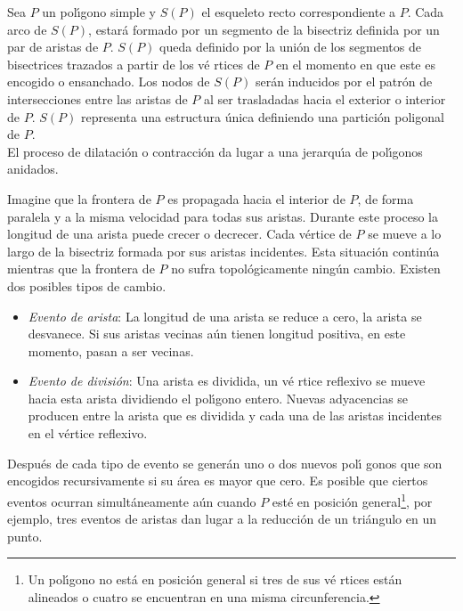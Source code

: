 \documentclass[12pt,english]{report}
\begin{document}
Sea $P$ un pol\'{\i}gono simple y $S(P)$ el esqueleto recto correspondiente
a $P$. Cada arco de $S(P)$, estar\'{a} formado por un segmento de la
bisectriz definida por un par de aristas de $P$. $S(P)$ queda definido por la
uni\'{o}n de los segmentos de bisectrices trazados a partir de los v\'{e}%
rtices de $P$ en el momento en que este es encogido o ensanchado. Los nodos
de $S(P)$ ser\'{a}n inducidos por el patr\'{o}n de intersecciones entre las
aristas de $P$ al ser trasladadas hacia el exterior o interior de $P$. $%
S(P)$ representa una estructura \'{u}nica definiendo una partici\'{o}n
poligonal de $P$.\\ El proceso de dilataci\'{o}n o contracci\'{o}n da lugar a
una jerarqu\'{\i}a de pol\'{\i}gonos anidados. %

Imagine que la frontera de $P$ es propagada hacia el interior de $P$, de
forma paralela y a la misma velocidad para todas sus aristas. Durante este
proceso la longitud de una arista puede crecer o decrecer. Cada v\'{e}rtice
de $P$ se mueve a lo largo de la bisectriz formada por sus aristas
incidentes. Esta situaci\'{o}n contin\'{u}a mientras que la frontera de $P$
no sufra topol\'{o}gicamente ning\'{u}n cambio. Existen dos posibles tipos
de cambio.

\begin{itemize}
\item[(1)] \emph{Evento de arista}: La longitud de una arista se reduce a
cero, la arista se desvanece. Si sus aristas vecinas a\'{u}n tienen longitud
positiva, en este momento, pasan a ser vecinas.

\item[(2)] \emph{Evento de divisi\'{o}n}: Una arista es dividida, un v\'{e}%
rtice reflexivo se mueve hacia esta arista dividiendo el pol\'{\i}gono entero. Nuevas adyacencias se
producen entre la arista que es dividida y cada una de las aristas
incidentes en el v\'{e}rtice reflexivo.
\end{itemize}

Despu\'{e}s de cada tipo de evento se gener\'{a}n uno o dos nuevos pol\'{\i}%
gonos que son encogidos recursivamente si su \'{a}rea es mayor que cero. Es
posible que ciertos eventos ocurran simult\'{a}neamente a\'{u}n cuando $P$
est\'{e} en posici\'{o}n general\footnote[1]{%
Un pol\'{\i}gono no est\'{a} en posici\'{o}n general si tres de sus v\'{e}%
rtices est\'{a}n alineados o cuatro se encuentran en una misma circunferencia.}, por ejemplo, tres eventos de aristas dan lugar a la reducci\'{o}n
de un tri\'{a}ngulo en un punto.
\end{document}

